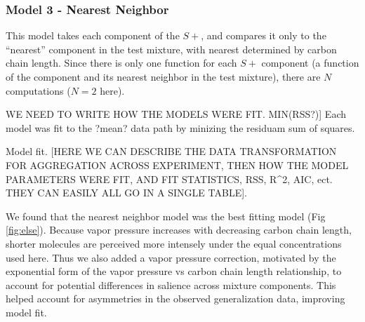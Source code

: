 \subsubsection{Model 3 - Nearest Neighbor}
This model takes each component of the $S+$, and compares it only to the ``nearest'' component in the test mixture, with nearest determined by carbon chain length.  Since there is only one function for each $S+$ component (a function of the component and its nearest neighbor in the test mixture), there are $N$ computations ($N=2$ here).  

WE NEED TO WRITE HOW THE MODELS WERE FIT. MIN(RSS?)] Each model was fit to the ?mean? data path by minizing the residuam sum of squares.

Model fit. [HERE WE CAN DESCRIBE THE DATA TRANSFORMATION FOR AGGREGATION ACROSS EXPERIMENT, THEN HOW THE MODEL PARAMETERS WERE FIT, AND FIT STATISTICS, RSS, R^2, AIC, ect. THEY CAN EASILY ALL GO IN A SINGLE TABLE]. 

We found that the nearest neighbor model was the best fitting model (Fig \ref{fig:else}).  Because vapor pressure increases with decreasing carbon chain length, shorter molecules are perceived more intensely under the equal concentrations used here.  Thus we also added a vapor pressure correction, motivated by the exponential form of the vapor pressure vs carbon chain length relationship, to account for potential differences in salience across mixture components.  This helped account for asymmetries in the observed generalization data, improving model fit.  